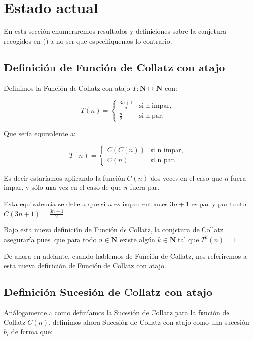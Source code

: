 \section{Estado actual}

En esta sección enumeraremos resultados y definiciones sobre la conjetura recogidos en (\cite{lagariasAnnotatedBibliography1, lagariasAnnotatedBibliography2}) a no ser que especifiquemos lo contrario.



\subsection{Definición de Función de Collatz con atajo}

Definimos la Función de Collatz con atajo $T:\mathbf{N} \mapsto \mathbf{N}$ con:

\begin{equation}
\label{T(n)}
    T(n) = \begin{cases}
    \frac{3n+1}{2} & \text{si n impar},\\
    \frac{n}{2} & \text{si n par}.
    \end{cases}
\end{equation}

Que sería equivalente a:

$$
    T(n) = \begin{cases}
    C(C(n)) & \text{si n impar},\\
    C(n) & \text{si n par}.
    \end{cases}
$$

Es decir estaríamos aplicando la función $C(n)$ dos veces en el caso que $n$ fuera impar, y sólo una vez en el caso de que $n$ fuera par.

Esta equivalencia se debe a que si $n$ es impar entonces $3n+1$ es par y por tanto $C(3n+1)=\frac{3n+1}{2}$.


Bajo esta nueva definición de Función de Collatz, la conjetura de Collatz aseguraría pues, que para todo $n \in \mathbf{N}$ existe algún $k \in \mathbf{N}$ tal que $T^k(n)=1$

De ahora en adelante, cuando hablemos de Función de Collatz, nos referiremos a esta nueva definición de Función de Collatz con atajo.


\subsection{Definición Sucesión de Collatz con atajo}
Análogamente a como definíamos la Sucesión de Collatz para la función de Collatz $C(n)$, definimos ahora Sucesión de Collatz con atajo como una sucesión $b_i$ de forma que:

